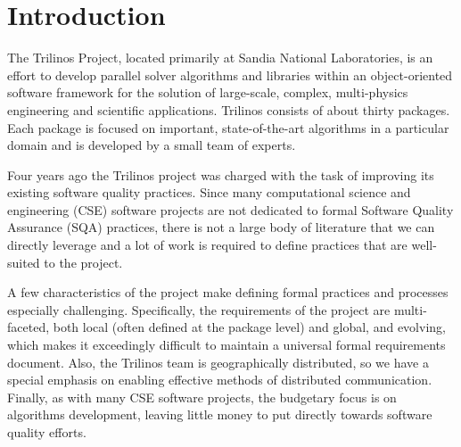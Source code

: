 \documentclass[times,10pt,twocolumn]{article}
\begin{document}
%
%
%
%

\section{Introduction}
\label{Section:Introduction}


The Trilinos Project, located primarily at Sandia National
Laboratories, is an effort to develop parallel solver algorithms and
libraries within an object-oriented software framework for the
solution of large-scale, complex, multi-physics engineering and
scientific applications.  Trilinos consists of about thirty
packages.  Each package is focused on important, state-of-the-art
algorithms in a particular domain and is developed by a small team
of experts.

Four years ago the Trilinos project was charged with the task of
improving its existing software quality practices.  Since many
computational science and engineering (CSE) software projects are
not dedicated to formal Software Quality Assurance (SQA) practices,
there is not a large body of literature that we can directly
leverage and a lot of work is required to define practices that are
well-suited to the project.

A few characteristics of the project make defining formal practices
and processes especially challenging.  Specifically, the
requirements of the project are multi-faceted, both local (often
defined at the package level) and global, and evolving, which makes
it exceedingly difficult to maintain a universal formal requirements
document. Also, the Trilinos team is geographically distributed, so
we have a special emphasis on enabling effective methods of
distributed communication. Finally, as with many CSE software
projects, the budgetary focus is on algorithms development, leaving
little money to put directly towards software quality efforts.
\end{document}
